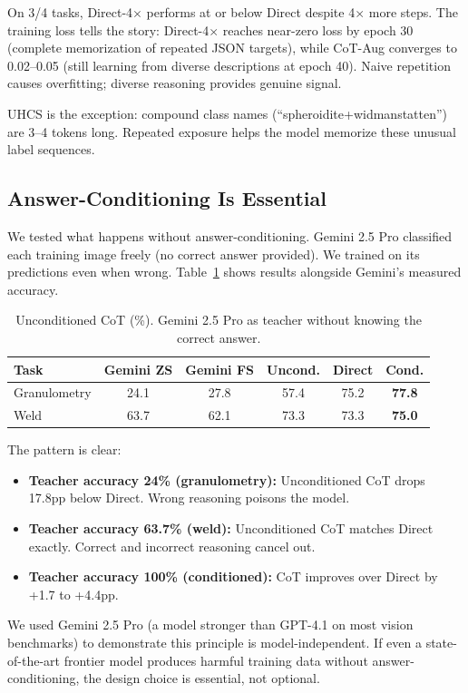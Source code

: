 \documentclass[11pt]{article}
\begin{document}
On 3/4 tasks, Direct-4$\times$ performs at or below Direct despite 4$\times$ more steps. The training loss tells the story: Direct-4$\times$ reaches near-zero loss by epoch 30 (complete memorization of repeated JSON targets), while CoT-Aug converges to 0.02--0.05 (still learning from diverse descriptions at epoch 40). Naive repetition causes overfitting; diverse reasoning provides genuine signal.

UHCS is the exception: compound class names (``spheroidite+widmanstatten'') are 3--4 tokens long. Repeated exposure helps the model memorize these unusual label sequences.

\subsection{Answer-Conditioning Is Essential}

We tested what happens without answer-conditioning. Gemini 2.5 Pro classified each training image freely (no correct answer provided). We trained on its predictions even when wrong. Table~\ref{tab:uncond} shows results alongside Gemini's measured accuracy.

\begin{table}[h]
\centering
\begin{tabular}{lccccc}
\toprule
Task & Gemini ZS & Gemini FS & Uncond. & Direct & Cond. \\
\midrule
Granulometry & 24.1 & 27.8 & 57.4 & 75.2 & \textbf{77.8} \\
Weld & 63.7 & 62.1 & 73.3 & 73.3 & \textbf{75.0} \\
\bottomrule
\end{tabular}
\caption{Unconditioned CoT (\%). Gemini 2.5 Pro as teacher without knowing the correct answer.}
\label{tab:uncond}
\end{table}

The pattern is clear:
\begin{itemize}
\item \textbf{Teacher accuracy 24\% (granulometry):} Unconditioned CoT drops 17.8pp below Direct. Wrong reasoning poisons the model.
\item \textbf{Teacher accuracy 63.7\% (weld):} Unconditioned CoT matches Direct exactly. Correct and incorrect reasoning cancel out.
\item \textbf{Teacher accuracy 100\% (conditioned):} CoT improves over Direct by +1.7 to +4.4pp.
\end{itemize}

We used Gemini 2.5 Pro (a model stronger than GPT-4.1 on most vision benchmarks) to demonstrate this principle is model-independent. If even a state-of-the-art frontier model produces harmful training data without answer-conditioning, the design choice is essential, not optional.
\end{document}
